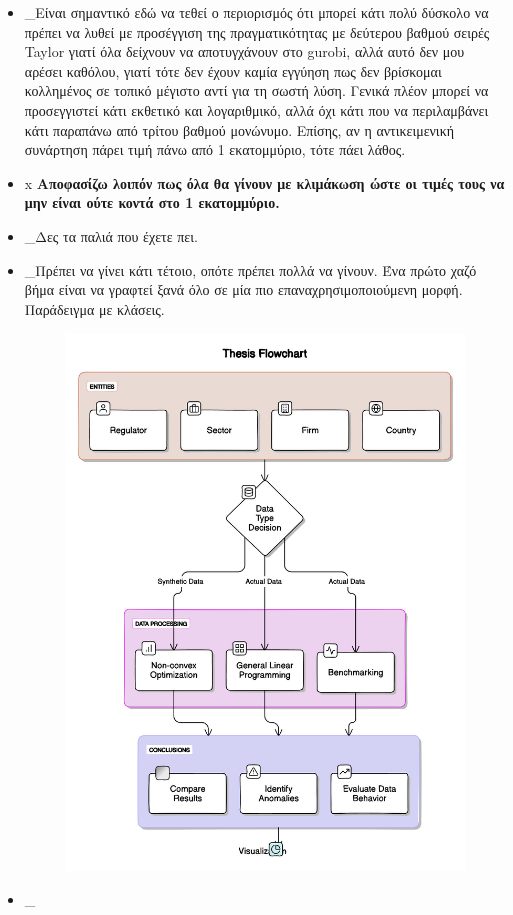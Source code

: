 \documentclass[a4paper,twoside,10pt]{article}
\begin{document}
\begin{itemize}[label={}]
	\item \lbrack\_\rbrack Είναι σημαντικό εδώ να τεθεί ο περιορισμός ότι μπορεί κάτι πολύ δύσκολο να πρέπει να λυθεί με προσέγγιση της πραγματικότητας με δεύτερου βαθμού σειρές Taylor γιατί όλα δείχνουν να αποτυγχάνουν στο gurobi, αλλά αυτό δεν μου αρέσει καθόλου, γιατί τότε δεν έχουν καμία εγγύηση πως δεν βρίσκομαι κολλημένος σε τοπικό μέγιστο αντί για τη σωστή λύση.
	Γενικά πλέον μπορεί να προσεγγιστεί κάτι εκθετικό και λογαριθμικό, αλλά όχι κάτι που να περιλαμβάνει κάτι παραπάνω από τρίτου βαθμού μονώνυμο. Επίσης, αν η αντικειμενική συνάρτηση πάρει τιμή πάνω από 1 εκατομμύριο, τότε πάει λάθος. 
	\item \lbrack x \rbrack \textbf{Αποφασίζω λοιπόν πως όλα θα γίνουν με κλιμάκωση ώστε οι τιμές τους να μην είναι ούτε κοντά στο 1 εκατομμύριο.}
	\item \lbrack\_\rbrack Δες τα παλιά που έχετε πει. 
	\item \lbrack\_\rbrack Πρέπει να γίνει κάτι τέτοιο, οπότε πρέπει πολλά να γίνουν. Ένα πρώτο χαζό βήμα είναι να γραφτεί ξανά όλο σε μία πιο επαναχρησιμοποιούμενη μορφή. Παράδειγμα με κλάσεις.
	\begin{figure}[H]
		\centering
		\includegraphics[width=0.7\linewidth]{images/diagram-export-8-28-2024-4_45_56-PM.jpg}
		\caption{}
		\label{fig:diagram-export-8-28-2024-44556-pm}
	\end{figure}
	\item \lbrack\_\rbrack 

\end{itemize}
\end{document}
